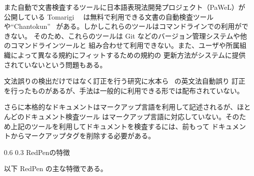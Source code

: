 \documentclass[a4j,twocolumn]{jarticle}
\makeatletter
\def\section{\@startsection{section}{1}{\z@}%
   {0.6\Cvs}%
   {0.3\Cvs}%
   {\reset@font\fontsize{10.5pt}{0pt}\bfseries}}
\makeatother
\begin{document}
また自動で文書検査するツールに日本語表現法開発プロジェクト（PaWeL）が公開している
Tomarigi~\cite{tomarigi}~\cite{tomarigi-paper} は無料で利用できる文書の自動検査ツール
や``Chantokun''~\cite{chantokun} がある。しかしこれらのツールはコマンドラインでの利用ができない。
そのため、これらのツールは Git などのバージョン管理システムや他のコマンドラインツールと
組み合わせて利用できない。また、ユーザや所属組織によって異なる規約にフィットするための規約の
更新方法がシステムに提供されていないという問題もある。 

文法誤りの検出だけではなく訂正を行う研究に水本ら~\cite{mizumoto12english} の英文法自動誤り
訂正を行ったものがあるが、手法は一般的に利用できる形では配布されていない。

さらに本格的なドキュメントはマークアップ言語を利用して記述されるが、ほとんどのドキュメント検査ツール
はマークアップ言語に対応していない。そのため上記のツールを利用してドキュメントを検査するには、前もって
ドキュメントからマークアップタグを削除する必要がある。

\section{RedPenの特徴}

以下 RedPen の主な特徴である。
\end{document}
